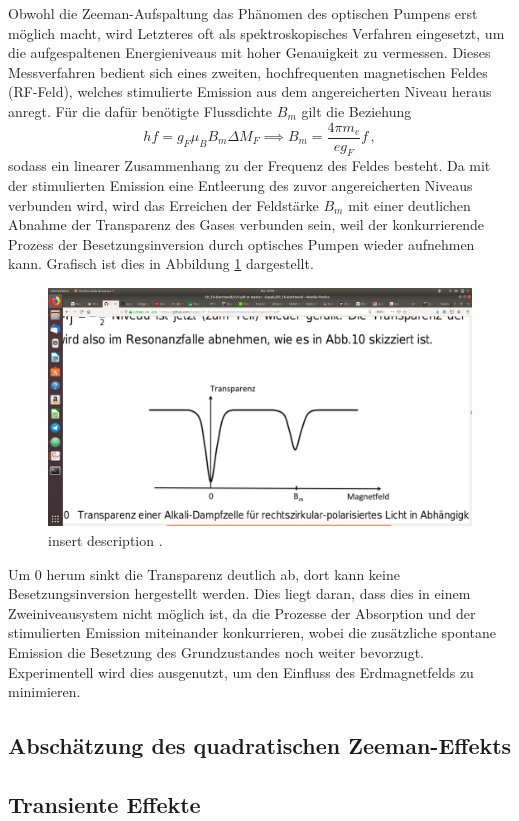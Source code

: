   Obwohl die Zeeman-Aufspaltung das Phänomen des optischen Pumpens erst möglich macht, wird Letzteres oft als spektroskopisches Verfahren eingesetzt, um die aufgespaltenen Energieniveaus mit hoher Genauigkeit zu vermessen. Dieses Messverfahren bedient sich eines zweiten, hochfrequenten magnetischen Feldes (RF-Feld), welches stimulierte Emission aus dem angereicherten Niveau heraus anregt. Für die dafür benötigte Flussdichte $B_m$ gilt die Beziehung
  \begin{equation}
    h f = g_F \mu_B B_m \Delta M_F \implies B_m = \frac{4 \pi m_e}{e g_F} f\,,
    \label{eqn:B_M_Theorie}
  \end{equation}
  sodass ein linearer Zusammenhang zu der Frequenz des Feldes besteht.
  Da mit der stimulierten Emission eine Entleerung des zuvor angereicherten Niveaus verbunden wird, wird das Erreichen der Feldstärke $B_m$ mit einer deutlichen Abnahme der Transparenz des Gases verbunden sein, weil der konkurrierende Prozess der Besetzungsinversion durch optisches Pumpen wieder aufnehmen kann. Grafisch ist dies in Abbildung \ref{fig:transparenz} dargestellt.

  \begin{figure}
    \centering
    \includegraphics[width=\textwidth]{pictures/transparenz.png}
    \caption{insert description \cite{stehendeWelle}.}
    \label{fig:transparenz}
  \end{figure}

  Um 0 herum sinkt die Transparenz deutlich ab, dort kann keine Besetzungsinversion hergestellt werden. Dies liegt daran, dass dies in einem Zweiniveausystem nicht möglich ist, da die Prozesse der Absorption und der stimulierten Emission miteinander konkurrieren, wobei die zusätzliche spontane Emission die Besetzung des Grundzustandes noch weiter bevorzugt. Experimentell wird dies ausgenutzt, um den Einfluss des Erdmagnetfelds zu minimieren.

  \subsection{Abschätzung des quadratischen Zeeman-Effekts}
  \label{subsec:quadratischerZeeman}

  \subsection{Transiente Effekte}
  \label{subsec:transient}
